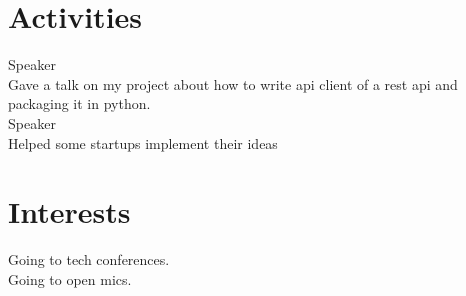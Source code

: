 \documentclass[]{deedy-resume-openfont}
\begin{document}
\begin{minipage}[t]{0.33\textwidth}
%
%

\section{Activities}
\textbullet{} Speaker \\
\textbullet{} Gave a talk on my project about how to write api client of a rest api and packaging it in python. \\
\textbullet{} Speaker \\
\textbullet{} Helped some startups implement their ideas \\
\sectionsep
%
%

\section{Interests}
\textbullet{} Going to tech conferences. \\
\textbullet{} Going to open mics. \\

%
%

\end{minipage}
\hfill
\end{document}
